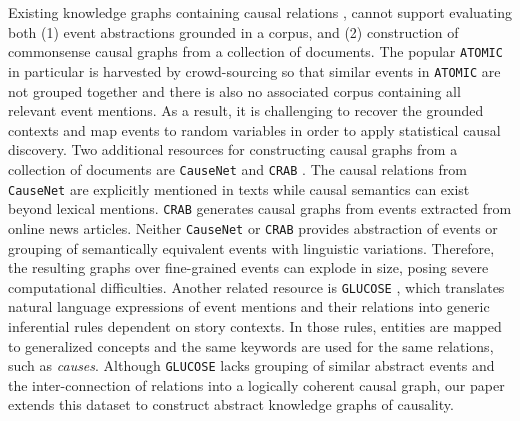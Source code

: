Existing knowledge graphs containing causal relations \cite{sap2019atomic,hwang2021comet,hassanzadeh2022knowledge,mbouadeu-etal-2023-evaluation}, cannot support evaluating both (1) event abstractions grounded in a corpus, and (2) construction of commonsense causal graphs from a collection of documents. %
The popular \texttt{ATOMIC} \citep{sap2019atomic} in particular is harvested by crowd-sourcing so that similar events in \texttt{ATOMIC} are not grouped together and there is also no associated corpus containing all relevant event mentions. As a result, it is challenging to recover the grounded contexts and map events to random variables in order to apply statistical causal discovery. Two additional resources for constructing causal graphs from a collection of documents are \texttt{CauseNet} \citep{heindorf2020causenet} and \texttt{CRAB} \cite{romanou2023crab}. 
The causal relations from \texttt{CauseNet} are explicitly mentioned in texts while causal semantics can exist beyond lexical mentions. \texttt{CRAB} generates causal graphs from events extracted from online news articles. Neither \texttt{CauseNet} or \texttt{CRAB} provides abstraction of events or grouping of semantically equivalent events with linguistic variations. Therefore, the resulting graphs over fine-grained events can explode in size, posing severe computational difficulties.  Another related resource is \texttt{GLUCOSE} \cite{mostafazadeh-etal-2020-glucose}, which translates natural language expressions of event mentions and their relations into generic inferential rules dependent on story contexts. In those rules, entities are mapped to generalized concepts and the same keywords are used for the same relations, such as \textit{causes}. Although \texttt{GLUCOSE} lacks grouping of similar abstract events and the inter-connection of relations into a logically coherent causal graph, our paper extends this dataset to construct abstract knowledge graphs of causality.

